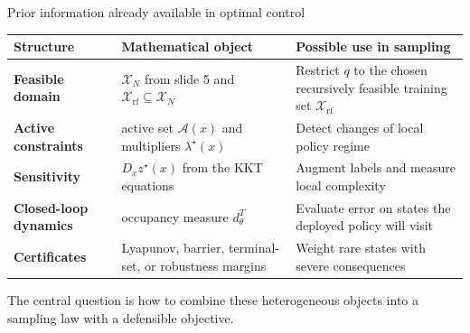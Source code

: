 \documentclass[aspectratio=169,10pt]{beamer}
\newcommand{\Xr}{\mathcal{X}_{\mathrm{rf}}}
\begin{document}
\begin{frame}{Prior information already available in optimal control}
\small
\setlength{\tabcolsep}{5pt}
\renewcommand{\arraystretch}{1.18}
\begin{tabular}{>{\bfseries\color{Teal}}p{} p{} p{}}
\toprule
Structure & Mathematical object & Possible use in sampling \\
\midrule
Feasible domain & $\mathcal X_N$ from slide 5 and $\Xr\subseteq\mathcal X_N$ & Restrict $q$ to the chosen recursively feasible training set $\Xr$ \\
Active constraints & active set $\mathcal A(x)$ and multipliers $\lambda^\star(x)$ & Detect changes of local policy regime \\
Sensitivity & $D_x z^\star(x)$ from the KKT equations & Augment labels and measure local complexity \\
Closed-loop dynamics & occupancy measure $d_\theta^T$ & Evaluate error on states the deployed policy will visit \\
Certificates & Lyapunov, barrier, terminal-set, or robustness margins & Weight rare states with severe consequences \\
\bottomrule
\end{tabular}

\vspace{0.18cm}
\color{Slate}\footnotesize The central question is how to combine these heterogeneous objects into a sampling law with a defensible objective.
\end{frame}
\end{document}
